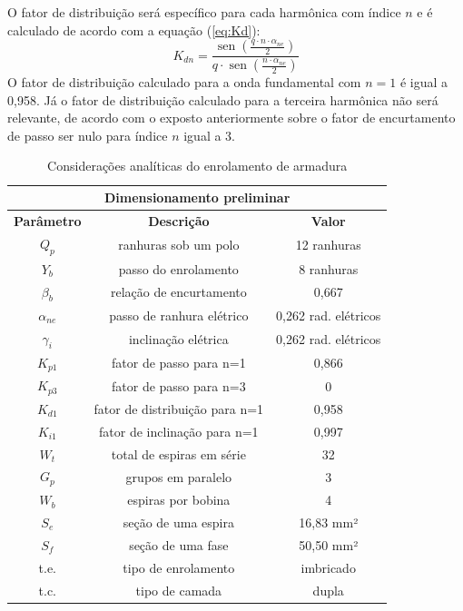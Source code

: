 \documentclass[conference]{IEEEtran}
\begin{document}
O fator de distribuição será específico para cada harmônica com índice $n$ e é calculado de acordo com a equação (\ref{eq:Kd}):
\begin{equation}
K_{dn} = \frac{\operatorname{sen}(\frac{q \cdot n \cdot \alpha_{ne}}{2})}{        
 q \cdot \operatorname{sen}( \frac{n \cdot \alpha_{ne}}{2})    } 
\label{eq:Kd}
\end{equation}
O fator de distribuição calculado para a onda fundamental com $n=1$ é igual a 0,958. Já o fator de distribuição calculado para a terceira harmônica não será relevante, de acordo com o exposto anteriormente sobre o fator de encurtamento de passo ser nulo para índice $n$ igual a 3.

\begin{table}[b]
\centering
\caption{Considerações analíticas do enrolamento de armadura}
\label{tab:base_armadura}
\begin{tabular}{|c|c|c|}
\hline
\multicolumn{3}{|c|}{\textbf{Dimensionamento preliminar}} \\ \hline
\textbf{Parâmetro} & \textbf{Descrição} & \textbf{Valor} \\ \hline
$Q_p$ & ranhuras sob um polo & 12 ranhuras \\ \hline
$Y_b$ & passo do enrolamento & 8 ranhuras \\ \hline
$ \beta_b $ & relação de encurtamento & 0,667 \\ \hline
$ \alpha_{ne} $ & passo de ranhura elétrico & 0,262 rad. elétricos \\ \hline
$ \gamma_i $ & inclinação elétrica & 0,262 rad. elétricos \\ \hline
$ K_{p1} $ & fator de passo para n=1 & 0,866  \\ \hline
$ K_{p3} $ & fator de passo para n=3 & 0 \\ \hline
$ K_{d1} $ & fator de distribuição para n=1 & 0,958  \\ \hline
$ K_{i1} $ & fator de inclinação para n=1 & 0,997  \\ \hline
$ W_t $ & total de espiras em série & 32 \\ \hline
$ G_p $ & grupos em paralelo & 3 \\ \hline
$ W_b $ & espiras por bobina & 4 \\ \hline
$ S_e $ & seção de uma espira & 16,83 mm² \\ \hline
$ S_f $ & seção de uma fase & 50,50 mm² \\ \hline
t.e. & tipo de enrolamento & imbricado \\ \hline
t.c. & tipo de camada & dupla \\ \hline
\end{tabular}
\end{table}
\end{document}
